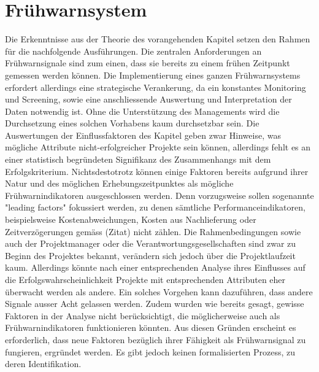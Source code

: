 
\section{Frühwarnsystem}\label{sec:diskfru}
Die Erkenntnisse aus der Theorie des vorangehenden Kapitel setzen den Rahmen für die nachfolgende Ausführungen. Die zentralen Anforderungen an Frühwarnsignale sind zum einen, dass sie bereits zu einem frühen Zeitpunkt gemessen werden können. Die Implementierung eines ganzen Frühwarnsystems erfordert allerdings eine strategische Verankerung, da ein konstantes Monitoring und Screening, sowie eine anschliessende Auswertung und Interpretation der Daten notwendig ist. Ohne die Unterstützung des Managements wird die Durchsetzung eines solchen Vorhabens kaum durchsetzbar sein.
Die Auswertungen der Einflussfaktoren des Kapitel %
geben zwar Hinweise, was mögliche Attribute nicht-erfolgreicher Projekte sein können, allerdings fehlt es an einer statistisch begründeten Signifikanz des Zusammenhangs mit dem Erfolgskriterium. Nichtsdestotrotz können einige Faktoren bereits aufgrund ihrer Natur und des möglichen Erhebungszeitpunktes als mögliche Frühwarnindikatoren ausgeschlossen werden. Denn vorzugsweise sollen sogenannte "leading factors" fokussiert werden, zu denen sämtliche Performanceindikatoren, beispielsweise Kostenabweichungen, Kosten aus Nachlieferung oder Zeitverzögerungen gemäss (Zitat) nicht zählen. Die Rahmenbedingungen sowie auch der Projektmanager oder die Verantwortungsgesellschaften sind zwar zu Beginn des Projektes bekannt, verändern sich jedoch über die Projektlaufzeit kaum. Allerdings könnte nach einer entsprechenden Analyse ihres Einflusses auf die Erfolgswahrscheinlichkeit Projekte mit entsprechenden Attributen eher überwacht werden als andere. Ein solches Vorgehen kann dazuführen, dass andere Signale ausser Acht gelassen werden. Zudem wurden wie bereits gesagt, gewisse Faktoren in der Analyse nicht berücksichtigt, die möglicherweise auch als Frühwarnindikatoren funktionieren könnten. Aus diesen Gründen erscheint es erforderlich, dass neue Faktoren bezüglich ihrer Fähigkeit als Frühwarnsignal zu fungieren, ergründet werden. Es gibt jedoch keinen formalisierten Prozess, zu deren Identifikation. 
